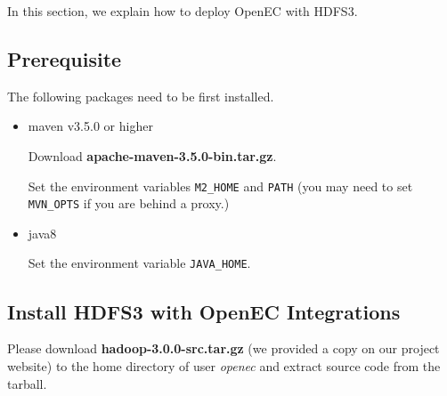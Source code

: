\documentclass[letterpaper,12pt]{article}
\newcommand{\openec}{{\sf\small OpenEC}\xspace}
\begin{document}
In this section, we explain how to deploy \openec with HDFS3.

\subsection{Prerequisite}

The following packages need to be first installed.

\begin{itemize}


\item maven v3.5.0 or higher

Download {\bf apache-maven-3.5.0-bin.tar.gz}.

\begin{center}
\noindent{}
\end{center}

Set the environment variables {\tt M2\_HOME} and {\tt PATH} (you may need to
set {\tt MVN\_OPTS} if you are behind a proxy.)

\begin{center}
\noindent{}
\end{center}



\item java8

\begin{center}
\noindent{}
\end{center}

Set the environment variable {\tt JAVA\_HOME}.

\end{itemize}

\subsection{Install HDFS3 with OpenEC Integrations}
Please download {\bf hadoop-3.0.0-src.tar.gz} (we provided a copy on our project website)
to the home directory of user {\sl openec} and extract source code from the tarball.
\end{document}
